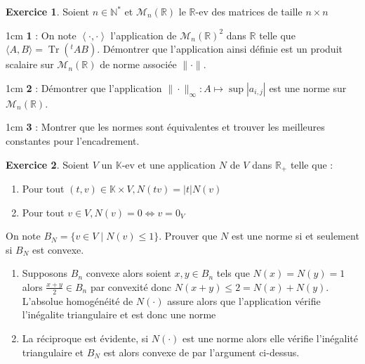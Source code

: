 \documentclass{report}
\newcommand{\N}{\mathbb{N}}
\newcommand{\R}{\mathbb{R}}
\newcommand{\K}{\mathbb{K}}
\newcommand{\mnr}{\mathcal{M}_n(\R)}
\DeclareMathOperator{\Tr}{Tr}
\theoremstyle{definition}
\newtheorem{exo}{Exercice}
\newenvironment{q}[1]{
    \begin{adjustwidth}{1cm}{}
    \textbf{#1} : }{
    \end{adjustwidth}}
\newcommand{\boxans}[1]{
    \begin{tcolorbox}[
            breakable,
            enhanced,
            interior style      = {
                left color      = main1white2!65!gray!8,
                middle color    = main1white2!50!gray!7,
                right color     = main1white2!35!gray!6
            },
            frame hidden,
            borderline west     = {2pt}{0pt}{main1white!30},
            sharp corners       = downhill,
            arc                 = 0 cm,
            boxrule             = 0 cm,
        ]
        #1
    \end{tcolorbox}
}
\newcommand{\itt}{\item[\(\triangleright\)]}
\begin{document}
\begin{exo}
    Soient \(n\in\N^*\) et \(\mnr\) le \(\R\)-ev des matrices de taille \(n\times n\)
    \begin{q}{1}
        On note \(\left\langle\cdot,\cdot\right\rangle\) l'application de \(\mnr^2\)
        dans \(\R\) telle que \(\langle A,B\rangle=\Tr(^tAB)\). Démontrer que l'application
        ainsi définie est un produit scalaire sur \(\mnr\) de norme associée \(\|\cdot\|\).
    \end{q}
    \begin{q}{2}
        Démontrer que l'application \(\|\cdot\|_\infty : A \mapsto \sup |a_{i,j}|\)
        est une norme sur \(\mnr\).
    \end{q}
    \begin{q}{3}
        Montrer que les normes sont équivalentes et trouver les meilleures constantes pour l'encadrement.
    \end{q}
\end{exo}

\begin{exo}
    Soient \(V\) un \(\K\)-ev et une application \(N\) de \(V\) dans \(\R_+\) telle que :
    \begin{enumerate}
        \itt Pour tout \(\left(t,v\right)\in\K\times V, N(tv)=|t|N(v)\)
        \itt Pour tout \(v\in V, N(v)=0 \Leftrightarrow v = 0_V\)
    \end{enumerate}
    On note \(B_N = \{v\in V\mid N(v)\leq 1\}\). Prouver que \(N\) est une norme si et seulement si \(B_N\) est convexe.
    \boxans{
        \begin{enumerate}
            \itt Supposons \(B_n\) convexe alors soient \(x,y\in B_n\) tels que \(N(x)=N(y)=1\)
            alors \(\frac{x+y}{2}\in B_n\) par convexité donc \(N(x+y)\leq 2 = N(x)+N(y)\).
            L'absolue homogénéité de \(N(\cdot)\) assure alors que l'application
            vérifie l'inégalite triangulaire et est donc une norme
            \itt La réciproque est évidente, si \(N(\cdot)\) est une norme alors elle vérifie
            l'inégalité triangulaire et \(B_N\) est alors convexe de par l'argument ci-dessus.
        \end{enumerate}
    }
\end{exo}
\end{document}
